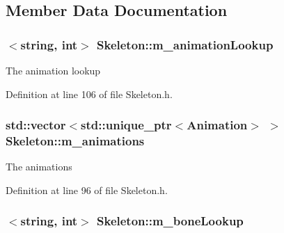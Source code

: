 \subsection{Member Data Documentation}
\subsubsection[{\texorpdfstring{m\+\_\+animation\+Lookup}{m_animationLookup}}]{$<${\bf string}, int$>$ Skeleton\+::m\+\_\+animation\+Lookup\hspace{0.3cm}{\ttfamily [private]}}\hypertarget{class_skeleton_a5dcba0b9955626744dc1a7efa35b5800}{}\label{class_skeleton_a5dcba0b9955626744dc1a7efa35b5800}


The animation lookup 



Definition at line 106 of file Skeleton.\+h.

\subsubsection[{\texorpdfstring{m\+\_\+animations}{m_animations}}]{\setlength{\rightskip}{0pt plus 5cm}std\+::vector$<$std\+::unique\+\_\+ptr$<${\bf Animation}$>$ $>$ Skeleton\+::m\+\_\+animations\hspace{0.3cm}{\ttfamily [private]}}\hypertarget{class_skeleton_a8332723240466214376407613a11f4ce}{}\label{class_skeleton_a8332723240466214376407613a11f4ce}


The animations 



Definition at line 96 of file Skeleton.\+h.

\subsubsection[{\texorpdfstring{m\+\_\+bone\+Lookup}{m_boneLookup}}]{$<${\bf string}, int$>$ Skeleton\+::m\+\_\+bone\+Lookup\hspace{0.3cm}{\ttfamily [private]}}\hypertarget{class_skeleton_aea181d3c2cd294fbf7c9cabb92f1fa19}{}\label{class_skeleton_aea181d3c2cd294fbf7c9cabb92f1fa19}


